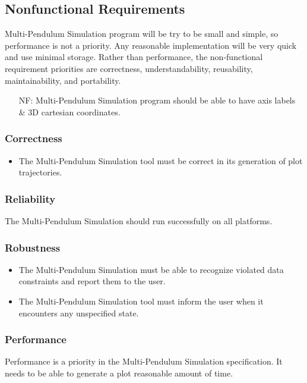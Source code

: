 \documentclass[12pt]{article}
\newcounter{reqnum} %
\newcounter{nfreqnum} %
\newcommand{\progname}{Multi-Pendulum Simulation }
\begin{document}
\subsection{Nonfunctional Requirements}

\progname program will be try to be small and simple, so performance is not a 
priority. Any reasonable implementation will be very quick and use minimal 
storage. Rather than performance, the non-functional requirement priorities 
are correctness, understandability, reusability, maintainability, and 
portability. 

\begin{itemize}
\item[NF\refstepcounter{nfreqnum}\thenfreqnum:] \progname program should be able to have axis
labels \& 3D cartesian coordinates.
\end{itemize}

\subsubsection*{Correctness}
\begin{itemize}
	\item The \progname tool must be correct in its generation of plot trajectories.
\end{itemize}

\subsubsection*{Reliability}

The \progname should run successfully on all platforms.

\subsubsection*{Robustness}
\begin{itemize}
	\item The \progname must be able to recognize violated data 
	constraints and report them to the user.
	\item The \progname tool must inform the user when it encounters any 
	unspecified state.
\end{itemize}

\subsubsection*{Performance}
Performance is a priority in the \progname
specification. It needs to be able to generate a plot reasonable amount of time.
\end{document}
